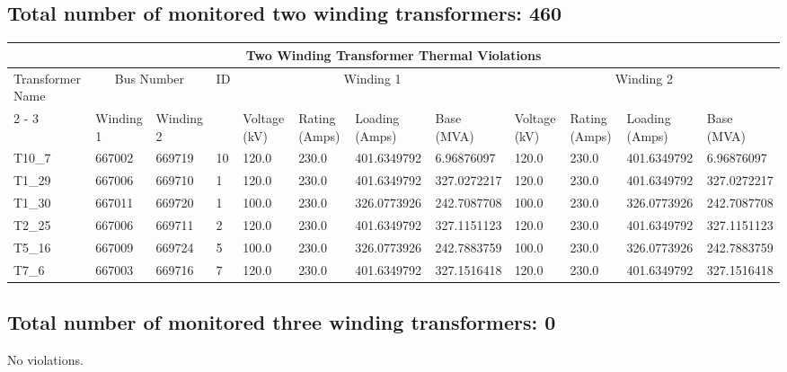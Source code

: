 \documentclass{article}%
\begin{document}
\subsection*{Total number of monitored two winding transformers: 460}%
\label{subsec:Totalnumberofmonitoredtwowindingtransformers460}%
\begin{tabularx}{\textwidth}{| p{1.7cm} | X | X |p{0.4cm} | X | X | X | X | X | X | X | X |}%
\hline%
\multicolumn{12}{|c|}{Two Winding Transformer Thermal Violations}\\%
\hline%
Transformer Name&\multicolumn{2}{|c|}{Bus Number}&ID&\multicolumn{4}{|c|}{Winding 1}&\multicolumn{4}{|c|}{Winding 2}\\%
\cline{2%
-%
3}%
\cline{5%
-%
12}%
&Winding 1&Winding 2&&Voltage (kV)&Rating (Amps)&Loading (Amps)&Base (MVA)&Voltage (kV)&Rating (Amps)&Loading (Amps)&Base (MVA)\\%
\hline%
T10\_7&667002&669719&10&120.0&230.0&401.6349792&6.96876097&120.0&230.0&401.6349792&6.96876097\\%
\hline%
\hline%
T1\_29&667006&669710&1&120.0&230.0&401.6349792&327.0272217&120.0&230.0&401.6349792&327.0272217\\%
\hline%
\hline%
T1\_30&667011&669720&1&100.0&230.0&326.0773926&242.7087708&100.0&230.0&326.0773926&242.7087708\\%
\hline%
\hline%
T2\_25&667006&669711&2&120.0&230.0&401.6349792&327.1151123&120.0&230.0&401.6349792&327.1151123\\%
\hline%
\hline%
T5\_16&667009&669724&5&100.0&230.0&326.0773926&242.7883759&100.0&230.0&326.0773926&242.7883759\\%
\hline%
\hline%
T7\_6&667003&669716&7&120.0&230.0&401.6349792&327.1516418&120.0&230.0&401.6349792&327.1516418\\%
\hline%
\end{tabularx}

%
\subsection*{Total number of monitored three winding transformers: 0}%
\label{subsec:Totalnumberofmonitoredthreewindingtransformers0}%
No violations.

%
\end{document}
